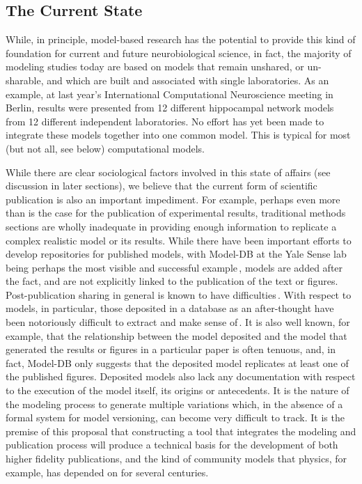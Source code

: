 \documentclass[12pt]{article}
\begin{document}
\subsection*{The Current State}

While, in principle, model-based research has the potential to provide this kind of foundation for current and future neurobiological science, in fact, the majority of modeling studies today are based on models that remain unshared, or un-sharable, and which are built and associated with single laboratories.  As an example, at last year's International Computational Neuroscience meeting in Berlin, results were presented from 12 different hippocampal network models from 12 different independent laboratories.  No effort has yet been made to integrate these models together into one common model.  This is typical for most (but not all, see below) computational models.

While there are clear sociological factors involved in this state of affairs (see discussion in later sections), we believe that the current form of scientific publication is also an important impediment.  For example, perhaps even more than is the case for the publication of experimental results, traditional methods sections are wholly inadequate in providing enough information to replicate a complex realistic model or its results.  While there have been important efforts to develop repositories for published models, with Model-DB at the Yale Sense lab being perhaps the most visible and successful example\,\cite{Hines:2004cr}, models are added after the fact, and are not explicitly linked to the publication of the text or figures.  Post-publication sharing in general is known to have difficulties\,\cite{Schofield:2009nx}. With respect to models, in particular, those deposited in a database as an after-thought have been notoriously difficult to extract and make sense of\,\cite{Nordlie:2009oq}.  It is also well known, for example, that the relationship between the model deposited and the model that generated the results or figures in a particular paper is often tenuous, and, in fact, Model-DB only suggests that the deposited model replicates at least one of the published figures.  Deposited models also lack any documentation with respect to the execution of the model itself, its origins or antecedents.  It is the nature of the modeling process to generate multiple variations which, in the absence of a formal system for model versioning, can become very difficult to track.  It is the premise of this proposal that constructing a tool that integrates the modeling and publication process will produce a technical basis for the development of both higher fidelity publications, and the kind of community models that physics, for example, has depended on for several centuries.  
\end{document}
